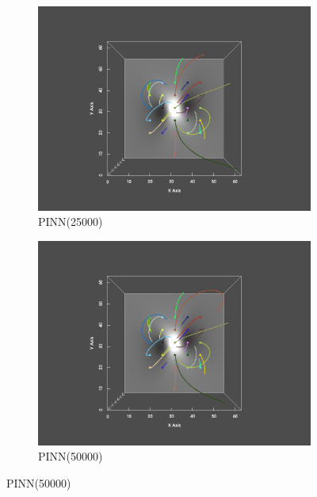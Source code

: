 \begin{figure}
  \begin{subfigure}{.5\linewidth}
    \centering
    \caption{PINN(25000)}
    \includegraphics[trim={6cm 1cm 6cm 2cm}, clip, width=\linewidth]{"img/PINN_025000_xy.pdf"}
  \end{subfigure}%
  \begin{subfigure}{.5\linewidth}
    \centering
    \caption{PINN(50000)}
    \includegraphics[trim={6cm 1cm 6cm 2cm}, clip, width=\linewidth]{"img/PINN_050000_xy.pdf"}
  \end{subfigure}
  

\end{figure}
